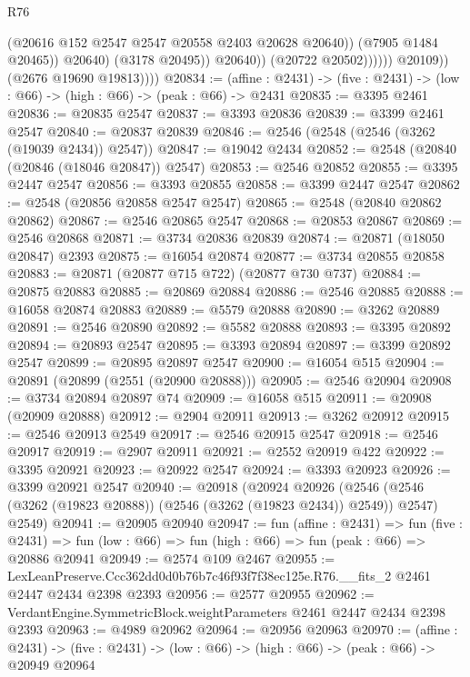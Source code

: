 \begin{lexlean}{R76}
\begin{coremodule}
                                    (@20616 @152 @2547 @2547 @20558 @2403 @20628 @20640))
                                  (@7905 @1484 @20465))
                                @20640)
                              (@3178 @20495))
                            @20640))
                        (@20722 @20502))))))
              @20109))
          (@2676 @19690 @19813))))
@20834 := (affine : @2431) -> (five : @2431) -> (low : @66) -> (high : @66) -> (peak : @66) -> @2431
@20835 := @3395 @2461
@20836 := @20835 @2547
@20837 := @3393 @20836
@20839 := @3399 @2461 @2547
@20840 := @20837 @20839
@20846 := @2546 (@2548 (@2546 (@3262 (@19039 @2434)) @2547))
@20847 := @19042 @2434
@20852 := @2548 (@20840 (@20846 (@18046 @20847)) @2547)
@20853 := @2546 @20852
@20855 := @3395 @2447 @2547
@20856 := @3393 @20855
@20858 := @3399 @2447 @2547
@20862 := @2548 (@20856 @20858 @2547 @2547)
@20865 := @2548 (@20840 @20862 @20862)
@20867 := @2546 @20865 @2547
@20868 := @20853 @20867
@20869 := @2546 @20868
@20871 := @3734 @20836 @20839
@20874 := @20871 (@18050 @20847) @2393
@20875 := @16054 @20874
@20877 := @3734 @20855 @20858
@20883 := @20871 (@20877 @715 @722) (@20877 @730 @737)
@20884 := @20875 @20883
@20885 := @20869 @20884
@20886 := @2546 @20885
@20888 := @16058 @20874 @20883
@20889 := @5579 @20888
@20890 := @3262 @20889
@20891 := @2546 @20890
@20892 := @5582 @20888
@20893 := @3395 @20892
@20894 := @20893 @2547
@20895 := @3393 @20894
@20897 := @3399 @20892 @2547
@20899 := @20895 @20897 @2547
@20900 := @16054 @515
@20904 := @20891 (@20899 (@2551 (@20900 @20888)))
@20905 := @2546 @20904
@20908 := @3734 @20894 @20897 @74
@20909 := @16058 @515
@20911 := @20908 (@20909 @20888)
@20912 := @2904 @20911
@20913 := @3262 @20912
@20915 := @2546 @20913 @2549
@20917 := @2546 @20915 @2547
@20918 := @2546 @20917
@20919 := @2907 @20911
@20921 := @2552 @20919 @422
@20922 := @3395 @20921
@20923 := @20922 @2547
@20924 := @3393 @20923
@20926 := @3399 @20921 @2547
@20940 := @20918
    (@20924
      @20926
      (@2546 (@2546 (@3262 (@19823 @20888)) (@2546 (@3262 (@19823 @2434)) @2549)) @2547)
      @2549)
@20941 := @20905 @20940
@20947 := fun (affine : @2431) =>
  fun (five : @2431) => fun (low : @66) => fun (high : @66) => fun (peak : @66) => @20886 @20941
@20949 := @2574 @109 @2467
@20955 := LexLeanPreserve.Ccc362dd0d0b76b7c46f93f7f38ec125e.R76.__fits_2
    @2461
    @2447
    @2434
    @2398
    @2393
@20956 := @2577 @20955
@20962 := VerdantEngine.SymmetricBlock.weightParameters @2461 @2447 @2434 @2398 @2393
@20963 := @4989 @20962
@20964 := @20956 @20963
@20970 := (affine : @2431) ->
  (five : @2431) -> (low : @66) -> (high : @66) -> (peak : @66) -> @20949 @20964

\end{coremodule}
\end{lexlean}
